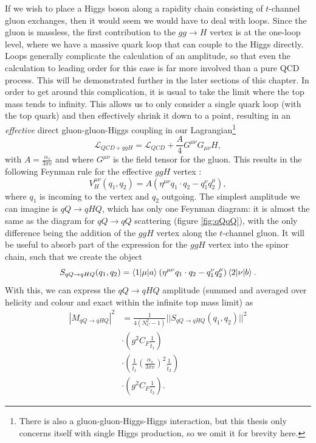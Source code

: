If we wish to place a Higgs boson along a rapidity chain consisting of $t$-channel gluon exchanges, then it would seem we would have to deal with loops. Since the gluon is massless, the first contribution to the $gg \to H$ vertex is at the one-loop level, where we have a massive quark loop that can couple to the Higgs directly. Loops generally complicate the calculation of an amplitude, so that even the calculation to leading order for this case is far more involved than a pure QCD process. This will be demonstrated further in the later sections of this chapter. In order to get around this complication, it is usual to take the limit where the top mass tends to infinity. This allows us to only consider a single quark loop (with the top quark) and then effectively shrink it down to a point, resulting in an \emph{effective} direct gluon-gluon-Higgs coupling in our Lagrangian\footnote{There is also a gluon-gluon-Higgs-Higgs interaction, but this thesis only concerns itself with single Higgs production, so we omit it for brevity here.} 
\begin{equation}
\mathscr{L}_{QCD + ggH} = \mathscr{L}_{QCD} + \frac{A}{4} G^{\mu \nu}G_{\mu \nu}H,
\end{equation}
with $A = \frac{\alpha_s}{3 \pi v}$ \cite{Duca2003} and where $G^{\mu \nu}$ is the field tensor for the gluon. This results in the following Feynman rule for the effective $ggH$ vertex \cite{Andersen2009a}:
\begin{equation}
V_H^{\mu \nu}(q_1, q_2) = A \left( \eta^{\mu \nu} q_1 \cdot q_2 - q_1^\nu q_2^\mu \right),
\end{equation}
where $q_1$ is incoming to the vertex and $q_2$ outgoing. The simplest amplitude we can imagine is $qQ \to qHQ$, which has only one Feynman diagram: it is almost the same as the diagram for $qQ \to qQ$ scattering (figure \ref{fig:qQqQ}), with the only difference being the addition of the $ggH$ vertex along the $t$-channel gluon. It will be useful to absorb part of the expression for the $ggH$ vertex into the spinor chain, such that we create the object
\begin{equation}
S_{qQ \to qHQ}(q_1, q_2) = \mathinner{\langle1\vert\mu\vert a\rangle}_{} (\eta^{\mu \nu}q_1 \cdot q_2 - q_1^\nu q_2^\mu)\mathinner{\langle2\vert\nu\vert b\rangle}_{}. 
\end{equation} %
With this, we can express the $qQ \to qHQ$ amplitude (summed and averaged over helicity and colour and exact within the infinite top mass limit) as
\begin{equation}
\begin{split}
|M_{qQ \to qHQ}|^2 &= \frac{1}{4(N_C^2 - 1)} ||S_{qQ \to qHQ}(q_1, q_2)||^2 \\
& \cdot \left(g^2 C_F \frac{1}{\hat{t}_1} \right) \\
& \cdot \left(\frac{1}{\hat{t}_1} \left(\frac{\alpha_s}{3 \pi v} \right)^2 \frac{1}{\hat{t}_2} \right) \\
& \cdot \left(g^2 C_F \frac{1}{\hat{t}_2} \right).
\end{split}
\end{equation}
